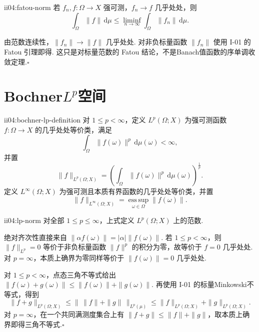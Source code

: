 \begin{FACorollary}{ii04:fatou-norm}
若 \(\displaystyle f_n,f:\Omega\to X\) 强可测，\(\displaystyle f_n\to f\) 几乎处处，则
\[
\int_\Omega\|f\|\,\mathrm{d}\mu
\leqslant
\liminf_{n\to\infty}
\int_\Omega\|f_n\|\,\mathrm{d}\mu.
\]
\end{FACorollary}

\begin{FAProof}
由范数连续性，\(\displaystyle\|f_n\|\to\|f\|\) 几乎处处. 对非负标量函数 \(\displaystyle\|f_n\|\) 使用 I-01 的 Fatou 引理即得. 这只是对标量范数的 Fatou 结论，不是Banach值函数的序单调收敛定理.\hfill\(\square\)
\end{FAProof}

\section{Bochner\(\displaystyle L^p\)空间}\label{sec:ii04-bochner-lp}

\begin{FADefinition}{ii04:bochner-lp-definition}
对 \(\displaystyle1\leqslant p<\infty\)，定义 \(\displaystyle L^p(\Omega;X)\) 为强可测函数 \(\displaystyle f:\Omega\to X\) 的几乎处处等价类，满足
\[
\int_\Omega\|f(\omega)\|^p\,\mathrm{d}\mu(\omega)<\infty,
\]
并置
\[
\|f\|_{L^p(\Omega;X)}
=
\left(
\int_\Omega\|f(\omega)\|^p\,\mathrm{d}\mu(\omega)
\right)^{\frac{1}{p}}.
\]
定义 \(\displaystyle L^\infty(\Omega;X)\) 为强可测且本质有界函数的几乎处处等价类，并置
\[
\|f\|_{L^\infty(\Omega;X)}
=
\operatorname*{ess\,sup}_{\omega\in\Omega}\|f(\omega)\|.
\]
\end{FADefinition}

\begin{FAProposition}{ii04:lp-norm}
对全部 \(\displaystyle1\leqslant p\leqslant\infty\)，上式定义 \(\displaystyle L^p(\Omega;X)\) 上的范数.
\end{FAProposition}

\begin{FAProof}
绝对齐次性直接来自 \(\displaystyle\|\alpha f(\omega)\|=|\alpha|\|f(\omega)\|\). 若 \(\displaystyle1\leqslant p<\infty\)，则 \(\displaystyle\|f\|_{L^p}=0\) 等价于非负标量函数 \(\displaystyle\|f\|^p\) 的积分为零，故等价于 \(\displaystyle f=0\) 几乎处处. 对 \(\displaystyle p=\infty\)，本质上确界为零同样等价于 \(\displaystyle\|f(\omega)\|=0\) 几乎处处.

对 \(\displaystyle1\leqslant p<\infty\)，点态三角不等式给出
\(\displaystyle \|f(\omega)+g(\omega)\| \leqslant \|f(\omega)\|+\|g(\omega)\|.\)
再使用 I-01 的标量Minkowski不等式，得到
\[
\|f+g\|_{L^p(\Omega;X)}
\leqslant
\|\,\|f\|+\|g\|\,\|_{L^p(\mu)}
\leqslant
\|f\|_{L^p(\Omega;X)}+
\|g\|_{L^p(\Omega;X)}.
\]
对 \(\displaystyle p=\infty\)，在一个共同满测度集合上有 \(\displaystyle\|f+g\|\leqslant\|f\|+\|g\|\)，取本质上确界即得三角不等式.\hfill\(\square\)
\end{FAProof}

